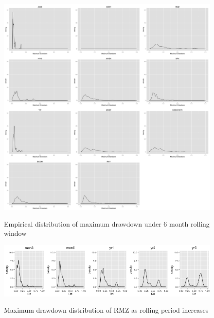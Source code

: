 \begin{figure}[h]
\caption{Empirical distribution of maximum drawdown under 6 month rolling window} 
\centering
\includegraphics[width=15cm]{../results/maxdd_dist_mon6}
\label{fig: dist_mdd}
\end{figure}

\fi

\begin{figure}[h]
\caption{Maximum drawdown distribution of RMZ as rolling period increases} 
\centering 
\includegraphics[width = 1\textwidth]{../results/maxdd_RMZ}
\label{fig: dmaxdd_RMZ}
\end{figure}

\iffalse

